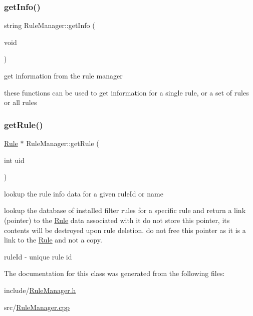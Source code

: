 \subsubsection{\texorpdfstring{get\+Info()}{getInfo()}}
{\footnotesize\ttfamily string Rule\+Manager\+::get\+Info (\begin{DoxyParamCaption}\item[{void}]{ }\end{DoxyParamCaption})}



get information from the rule manager 

these functions can be used to get information for a single rule, or a set of rules or all rules \mbox{\label{classRuleManager_ab081c7bea7b31ff32059c1b470b6208d}} 
\subsubsection{\texorpdfstring{get\+Rule()}{getRule()}}
{\footnotesize\ttfamily \hyperlink{classRule}{Rule} $\ast$ Rule\+Manager\+::get\+Rule (\begin{DoxyParamCaption}\item[{int}]{uid }\end{DoxyParamCaption})}



lookup the rule info data for a given rule\+Id or name 

lookup the database of installed filter rules for a specific rule and return a link (pointer) to the \hyperlink{classRule}{Rule} data associated with it do not store this pointer, its contents will be destroyed upon rule deletion. do not free this pointer as it is a link to the \hyperlink{classRule}{Rule} and not a copy.

\begin{DoxyItemize}
\item {\ttfamily rule\+Id} -\/ unique rule id \end{DoxyItemize}


The documentation for this class was generated from the following files\+:\begin{DoxyCompactItemize}
\item 
include/\hyperlink{RuleManager_8h}{Rule\+Manager.\+h}\item 
src/\hyperlink{RuleManager_8cpp}{Rule\+Manager.\+cpp}\end{DoxyCompactItemize}
